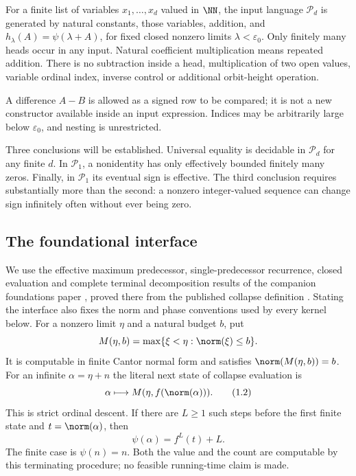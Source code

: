 \documentclass[11pt,a4paper]{article}
\begin{document}
\begin{definition}\label{def:positive}
For a finite list of variables $x_1,\ldots,x_d$ valued in $\NN$, the input
language $\mathcal P_d$ is generated by natural constants, those variables,
addition, and $h_\lambda(A)=\psi(\lambda+A)$, for fixed closed nonzero limits
$\lambda<\varepsilon_0$. Only finitely many heads occur in any input.
Natural coefficient multiplication means repeated addition. There is no
subtraction inside a head, multiplication of two open values, variable
ordinal index, inverse control or additional orbit-height operation.
\end{definition}
A difference $A-B$ is allowed as a signed row to be compared; it is not a
new constructor available inside an input expression. Indices may be
arbitrarily large below $\varepsilon_0$, and nesting is unrestricted.

Three conclusions will be established. Universal equality is decidable in
$\mathcal P_d$ for any finite $d$. In $\mathcal P_1$, a nonidentity has only
effectively bounded finitely many zeros. Finally, in $\mathcal P_1$ its
eventual sign is effective. The third conclusion requires substantially
more than the second: a nonzero integer-valued sequence can change sign
infinitely often without ever being zero.

\subsection{The foundational interface}
We use the effective maximum predecessor, single-predecessor recurrence,
closed evaluation and complete terminal decomposition results of the
companion foundations paper \cite{wwfoundations}, proved there from the
published collapse definition
\cite[\S2]{ww}. Stating the interface also fixes the norm and phase conventions
used by every kernel below.
For a nonzero limit $\eta$ and a natural budget $b$, put
\[
 M(\eta,b)=\max\{\xi<\eta:\norm(\xi)\le b\}.
\]
It is computable in finite Cantor normal form and satisfies
$\norm(M(\eta,b))=b$. For an infinite $\alpha=\eta+n$ the literal next
state of collapse evaluation is
\[
 \alpha\longmapsto M(\eta,f(\norm(\alpha))).         \tag{1.2}
\]
This is strict ordinal descent. If there are $L\ge1$ such steps before the
first finite state and $t=\norm(\alpha)$, then
\[
 \psi(\alpha)=f^L(t)+L.                              \tag{1.3}
\]
The finite case is $\psi(n)=n$. Both the value and the count are computable
by this terminating procedure; no feasible running-time claim is made.
\end{document}
